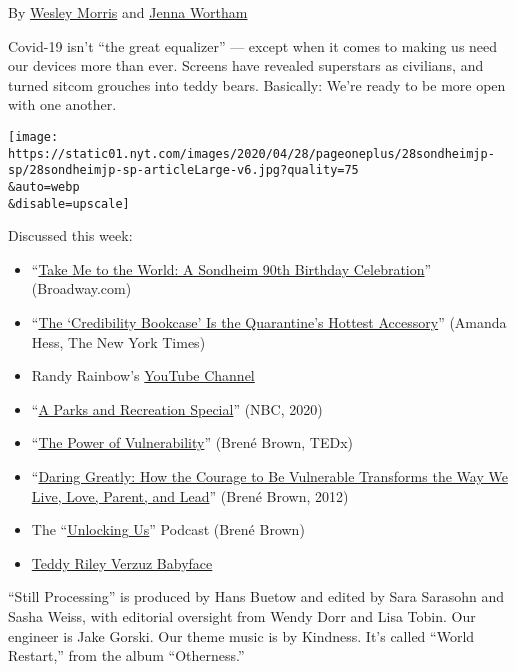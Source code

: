By \href{https://www.nytimes.com/by/wesley-morris}{Wesley Morris} and
\href{https://www.nytimes.com/by/jenna-wortham}{Jenna Wortham}

Covid-19 isn't ``the great equalizer'' --- except when it comes to
making us need our devices more than ever. Screens have revealed
superstars as civilians, and turned sitcom grouches into teddy bears.
Basically: We're ready to be more open with one another.

\texttt{[image: https://static01.nyt.com/images/2020/04/28/pageoneplus/28sondheimjp-sp/28sondheimjp-sp-articleLarge-v6.jpg?quality=75\\\&auto=webp\\\&disable=upscale]}

Discussed this week:

\begin{itemize}
\item
  ``\href{https://youtu.be/A92wZIvEUAw}{Take Me to the World: A Sondheim
  90th Birthday Celebration}'' (Broadway.com)
\item
  ``\href{https://www.nytimes.com/2020/05/01/arts/quarantine-bookcase-coronavirus.html}{The
  `Credibility Bookcase' Is the Quarantine's Hottest Accessory}''
  (Amanda Hess, The New York Times)
\item
  Randy Rainbow's
  \href{https://www.youtube.com/channel/UC07F26kHKkpW_qqvXzEGALA}{YouTube
  Channel}
\item
  ``\href{https://www.youtube.com/watch?v=1Vl_oUMyGYU}{A Parks and
  Recreation Special}'' (NBC, 2020)
\item
  ``\href{https://www.ted.com/talks/brene_brown_the_power_of_vulnerability?language=en}{The
  Power of Vulnerability}'' (Brené Brown, TEDx)
\item
  ``\href{https://brenebrown.com/books-audio/}{Daring Greatly: How the
  Courage to Be Vulnerable Transforms the Way We Live, Love, Parent, and
  Lead}'' (Brené Brown, 2012)
\item
  The
  ``\href{https://brenebrown.com/podcast/introducing-unlocking-us/}{Unlocking
  Us}'' Podcast (Brené Brown)
\item
  \href{https://www.youtube.com/watch?v=Z9xRjR8iz9c}{Teddy Riley Verzuz
  Babyface}
\end{itemize}

``Still Processing'' is produced by Hans Buetow and edited by Sara
Sarasohn and Sasha Weiss, with editorial oversight from Wendy Dorr and
Lisa Tobin. Our engineer is Jake Gorski. Our theme music is by Kindness.
It's called ``World Restart,'' from the album ``Otherness.''

